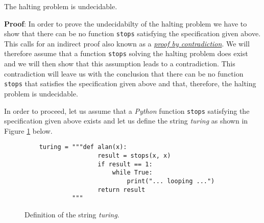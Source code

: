 \begin{Theorem}
  The halting problem is undecidable.
\end{Theorem}

\noindent
\textbf{Proof}:  In order to prove the undecidabilty of the halting problem we have to show that
there can be no function \texttt{stops} satisfying the specification given above.  This calls for an
indirect proof also known as a \href{http://en.wikipedia.org/wiki/Indirect_proof}{\emph{proof by contradiction}}.
We will therefore assume that a function \texttt{stops} solving the halting problem does
exist and we will then show that this assumption leads to a contradiction.  This contradiction will
leave us with the conclusion that there can be no function \texttt{stops} that satisfies
the specification given above and that, therefore, the halting problem is undecidable.

In order to proceed, let us assume that a \textsl{Python} function \texttt{stops}
satisfying the specification given above exists and let us define the string
\textsl{turing} as shown in Figure \ref{fig:turing-string} below.

\begin{figure}[!h]
  \centering
\begin{verbatim}  
    turing = """def alan(x):
                    result = stops(x, x)
                    if result == 1:
                        while True:
                            print("... looping ...")
                    return result
             """ 
\end{verbatim}
  \vspace*{-0.3cm}
  \caption{Definition of the string \textsl{turing}.}
  \label{fig:turing-string}
\end{figure}

